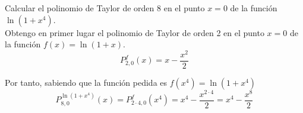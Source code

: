 \begin{ejercicio}
    Calcular el polinomio de Taylor de orden $8$ en el punto $x=0$ de la función $\ln(1+x^4)$.\\

    Obtengo en primer lugar el polinomio de Taylor de orden 2 en el punto $x=0$ de la función $f(x)=\ln(1+x)$.
    \begin{equation*}
        P_{2, 0}^{f}(x) = x - \frac{x^2}{2}
    \end{equation*}

    Por tanto, sabiendo que la función pedida es $f(x^4) = \ln(1+x^4)$
    \begin{equation*}
        P_{8, 0}^{\ln(1+x^4)}(x) = P_{2\cdot 4, 0}^{f}(x^4) = x^4 - \frac{x^{2\cdot 4}}{2} = x^4 - \frac{x^8}{2}
    \end{equation*}
\end{ejercicio}

